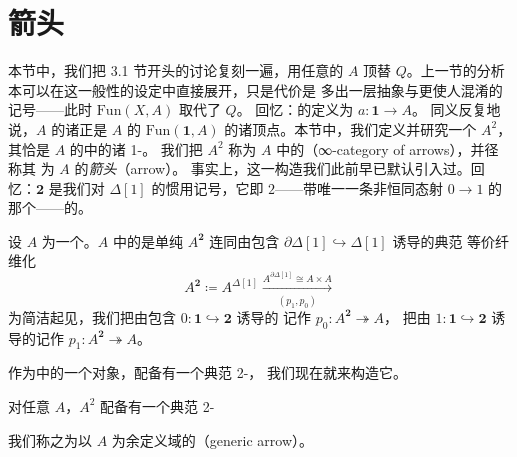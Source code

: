 \providecommand{\qcOne}{\mathbf{1}}   %
\providecommand{\qcTwo}{\mathbf{2}}   %
\providecommand{\qcor}[1]{\ulcorner#1\urcorner}   %

\section{箭头\trInfinityCategory}\label{sec:infinity-categories-of-arrows}

本节中，我们把 3.1 节开头的讨论复刻一遍，用任意的\trInfinityCategory{} $A$ 顶替%
\trQuasiCategory{} $Q$。上一节的分析本可以在这一般性的设定中直接展开，只是代价是%
多出一层抽象与更使人混淆的记号——此时\trFunctorSpace{} $\mathrm{Fun}(X,A)$ 取代了%
\trQuasiCategory{} $Q$。
回忆：\trInfinityCategory{}的\trElement{}定义为\trFunctor{} $a\colon\qcOne\to A$。%
同义反复地说，$A$ 的诸\trElement{}正是 $A$ 的\trUnderlyingQuasiCategory{}%
$\mathrm{Fun}(\qcOne,A)$ 的诸顶点。本节中，我们定义并研究一个\trInfinityCategory{}%
$A^{2}$，其\trElement{}恰是 $A$ 的\trUnderlyingQuasiCategory{}中的诸 1-\trSimplex{}。%
我们把 $A^{2}$ 称为 $A$ 中的\textbf{\trArrowInfinityCategory}（∞-category of arrows），并径称其%
\trElement{}为 $A$ 的\emph{箭头}（arrow）。%
事实上，这一构造我们此前早已默认引入过。回忆：$\qcTwo$ 是我们对\trQuasiCategory{}%
$\Delta[1]$ 的惯用记号，它即\trCategory{} $2$——带唯一一条非恒同态射 $0\to 1$ 的%
那个——的\trNerve{}。

\begin{definition}[\trArrowInfinityCategory]\label{def:arrow-infinity-category}
设 $A$ 为一个\trInfinityCategory。$A$ 中的\trArrowInfinityCategory{}是单纯\trCotensor{}
$A^{\qcTwo}$ 连同由包含 $\partial\Delta[1]\hookrightarrow\Delta[1]$ 诱导的典范%
\trEndpointEvaluation{}等价纤维化
\[
A^{\qcTwo}\coloneqq A^{\Delta[1]}\xrightarrow[\ (p_{1},p_{0})\ ]{A^{\partial\Delta[1]}\cong A\times A}
\]
为简洁起见，我们把由包含 $0\colon\qcOne\hookrightarrow\qcTwo$ 诱导的%
\trDomainEvaluation{}记作 $p_{0}\colon A^{\qcTwo}\twoheadrightarrow A$，
把由 $1\colon\qcOne\hookrightarrow\qcTwo$ 诱导的\trCodomainEvaluation{}记作%
$p_{1}\colon A^{\qcTwo}\twoheadrightarrow A$。
\end{definition}

作为\trHomotopyTwoCategory{}中的一个对象，\trArrowInfinityCategory{}配备有一个典范 2-\trCell{}，%
我们现在就来构造它。

\begin{lemma}[\trGenericArrow]\label{lem:generic-arrow}
对任意\trInfinityCategory{} $A$，\trArrowInfinityCategory $A^{2}$ 配备有一个典范 2-\trCell
\begin{rveq}\label{eq:generic-arrow}
\end{rveq}
我们称之为以 $A$ 为余定义域的\textbf{\trGenericArrow}（generic arrow）。
\end{lemma}

